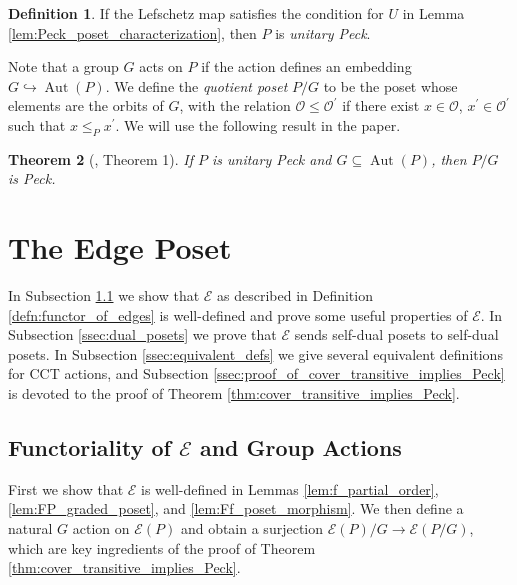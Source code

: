 \documentclass[smallextended, envcountsame, numbook]{svjour3}
\theoremstyle{plain}
\newtheorem{thm}{Theorem}[section]
\theoremstyle{definition}
\newtheorem{defn}[thm]{Definition}
\theoremstyle{remark}
\numberwithin{equation}{section}
\newcommand\ssec{\subsection}
\newcommand\Aut{\operatorname{Aut}}
\begin{document}
\begin{defn}
If the Lefschetz map satisfies the condition for $U$ in Lemma \ref{lem:Peck_poset_characterization}, then $P$ is \textit{unitary Peck}.
\end{defn}

Note that a group $G$ acts on $P$ if the action defines an embedding $G\hookrightarrow \Aut(P)$. We define the \textit{quotient poset} $P/G$ to be the poset whose elements are the orbits of $G$, with the relation $\mathcal{O}\le \mathcal{O}^\prime$ if there exist $x\in \mathcal{O}$, $x^\prime\in \mathcal{O}^\prime$ such that $x\le_{P} x^\prime$.  We will use the following result in the paper.

\begin{thm}[\cite{quotients_stanley}, Theorem 1]
\label{thm:quotients_of_unitary_peck_posets}
If $P$ is unitary Peck and $G\subseteq\Aut(P)$, then $P/G$ is Peck.
\end{thm}



\section{The Edge Poset}
\label{sec:functor_of_edges}

In Subsection \ref{ssec:functoriality} we show that $\mathcal E$ as described in Definition \ref{defn:functor_of_edges} is well-defined and prove some useful properties of $\mathcal E$.  In Subsection \ref{ssec:dual_posets} we prove that $\mathcal{E}$ sends self-dual posets to self-dual posets.  In Subsection \ref{ssec:equivalent_defs} we give several equivalent definitions for CCT actions, and Subsection \ref{ssec:proof_of_cover_transitive_implies_Peck} is devoted to the proof of Theorem \ref{thm:cover_transitive_implies_Peck}.

\ssec{Functoriality of $\mathcal E$ and Group Actions}
\label{ssec:functoriality}
First we show that $\mathcal{E}$ is well-defined in Lemmas \ref{lem:f_partial_order}, \ref{lem:FP_graded_poset}, and \ref{lem:Ff_poset_morphism}.  We then define a natural $G$ action on $\mathcal E(P)$ and obtain a surjection $\mathcal E(P)/G\rightarrow \mathcal E(P/G)$, which are key ingredients of the proof of Theorem \ref{thm:cover_transitive_implies_Peck}.
\end{document}
